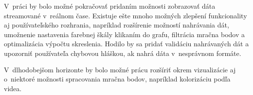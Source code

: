V~práci by bolo možné pokračovať pridaním možnosti zobrazovať dáta streamované v~reálnom čase. Existuje ešte mnoho možných zlepšení funkcionality aj používateľského rozhrania, napríklad rozšírenie možností nahrávania dát, umožnenie nastavenia farebnej škály klikaním do grafu, filtrácia mračna bodov a optimalizácia výpočtu skreslenia. Hodilo by sa pridať validáciu nahrávaných dát a upozorniť používateľa chybovou hláškou, ak nahrá dáta v~nesprávnom formáte.

V~dlhodobejšom horizonte by bolo možné prácu rozšíriť okrem vizualizácie aj o~niektoré možnosti spracovania mračna bodov, napríklad kolorizáciu podľa videa.


%
